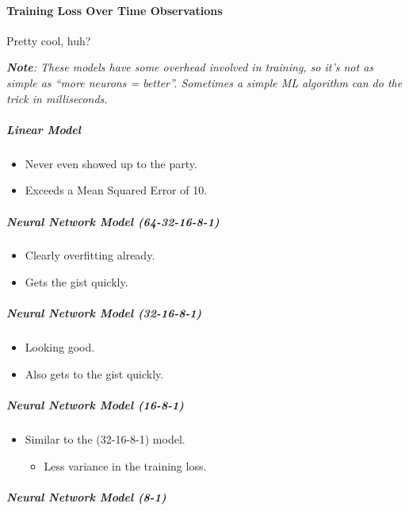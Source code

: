 \documentclass[11pt]{article}
\providecommand{\tightlist}{%
      \setlength{\itemsep}{0pt}\setlength{\parskip}{0pt}}
\begin{document}
    \paragraph{Training Loss Over Time
Observations}\label{training-loss-over-time-observations}

Pretty cool, huh?

\emph{\textbf{Note}: These models have some overhead involved in
training, so it's not as simple as ``more neurons = better''. Sometimes
a simple ML algorithm can do the trick in milliseconds.}

\subparagraph{Linear Model}\label{linear-model}

\begin{itemize}
\tightlist
\item
  Never even showed up to the party.
\item
  Exceeds a Mean Squared Error of 10.
\end{itemize}

\subparagraph{Neural Network Model
(64-32-16-8-1)}\label{neural-network-model-64-32-16-8-1}

\begin{itemize}
\tightlist
\item
  Clearly overfitting already.
\item
  Gets the gist quickly.
\end{itemize}

\subparagraph{Neural Network Model
(32-16-8-1)}\label{neural-network-model-32-16-8-1}

\begin{itemize}
\tightlist
\item
  Looking good.
\item
  Also gets to the gist quickly.
\end{itemize}

\subparagraph{Neural Network Model
(16-8-1)}\label{neural-network-model-16-8-1}

\begin{itemize}
\tightlist
\item
  Similar to the (32-16-8-1) model.

  \begin{itemize}
  \tightlist
  \item
    Less variance in the training loss.
  \end{itemize}
\end{itemize}

\subparagraph{Neural Network Model
(8-1)}\label{neural-network-model-8-1}
\end{document}
